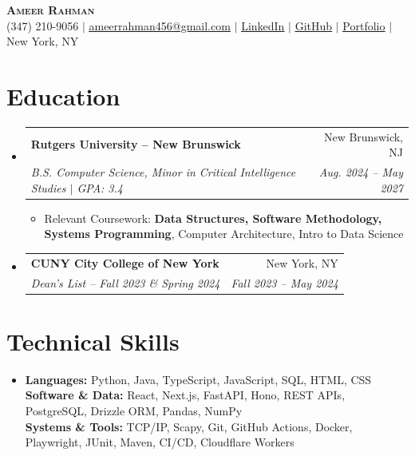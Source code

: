 \documentclass[letterpaper,10pt]{article}
\makeatletter
\newcommand{\resumeItem}[1]{\item\small{#1}}
\newcommand{\resumeSubheading}[4]{
  \vspace{1pt}\item
  \begin{tabular*}{0.97\textwidth}[t]{l@{\extracolsep{\fill}}r}
    \textbf{#1} & #2 \\
    \textit{\small #3} & \textit{\small #4} \\
  \end{tabular*}\vspace{-3pt}
}
\newcommand{\resumeSubHeadingListStart}{\begin{itemize}[leftmargin=0.15in,label={},itemsep=0pt,topsep=0pt]}
\newcommand{\resumeSubHeadingListEnd}{\end{itemize}}
\newcommand{\resumeItemListStart}{\begin{itemize}[leftmargin=0.15in,label=\textbullet,itemsep=-2pt,topsep=0pt]}
\newcommand{\resumeItemListEnd}{\end{itemize}\vspace{0pt}}
\makeatother
\begin{document}
\begin{center}
  {\Huge\scshape\textbf{Ameer Rahman}} \\ \vspace{2pt}
  \small (347) 210-9056 $|$
  \href{mailto:ameerrahman456@gmail.com}{\underline{ameerrahman456@gmail.com}} $|$
  \href{https://www.linkedin.com/in/ameer-rahman-a3bb232a0/}{\underline{LinkedIn}} $|$
  \href{https://github.com/ameer-rah}{\underline{GitHub}} $|$
  \href{https://ameer-rahman.info/}{\underline{Portfolio}} $|$ New York, NY
\end{center}

\section{Education}
\resumeSubHeadingListStart
  \resumeSubheading{Rutgers University -- New Brunswick}{New Brunswick, NJ}
    {B.S. Computer Science, Minor in Critical Intelligence Studies $|$ GPA: 3.4}{Aug. 2024 -- May 2027}
    \resumeItemListStart
      \resumeItem{Relevant Coursework: \textbf{Data Structures, Software Methodology, Systems Programming}, Computer Architecture, Intro to Data Science}
    \resumeItemListEnd
  \resumeSubheading{CUNY City College of New York}{New York, NY}
    {Dean's List -- Fall 2023 \& Spring 2024}{Fall 2023 -- May 2024}
\resumeSubHeadingListEnd

\section{Technical Skills}
\begin{itemize}[leftmargin=0.15in,label={},topsep=0pt]
  \small\item{
    \textbf{Languages:} Python, Java, TypeScript, JavaScript, SQL, HTML, CSS \\
    \textbf{Software \& Data:} React, Next.js, FastAPI, Hono, REST APIs, PostgreSQL, Drizzle ORM, Pandas, NumPy \\
    \textbf{Systems \& Tools:} TCP/IP, Scapy, Git, GitHub Actions, Docker, Playwright, JUnit, Maven, CI/CD, Cloudflare Workers
  }
\end{itemize}
\end{document}
